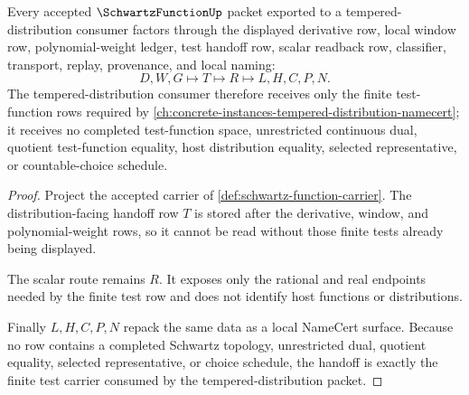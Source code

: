 \begin{theorem}
\label{thm:schwartz-function-tempered-distribution-handoff}
Every accepted $\SchwartzFunctionUp$ packet exported to a tempered-distribution consumer factors through the displayed derivative row, local window row, polynomial-weight ledger, test handoff row, scalar readback row, classifier, transport, replay, provenance, and local naming:
$$
D,W,G\longmapsto T\longmapsto R\longmapsto L,H,C,P,N .
$$
The tempered-distribution consumer therefore receives only the finite test-function rows required by \autoref{ch:concrete-instances-tempered-distribution-namecert}; it receives no completed test-function space, unrestricted continuous dual, quotient test-function equality, host distribution equality, selected representative, or countable-choice schedule.
\end{theorem}
\begin{proof}
Project the accepted carrier of \autoref{def:schwartz-function-carrier}. The distribution-facing handoff row $T$ is stored after the derivative, window, and polynomial-weight rows, so it cannot be read without those finite tests already being displayed.

The scalar route remains $R$. It exposes only the rational and real endpoints needed by the finite test row and does not identify host functions or distributions.

Finally $L,H,C,P,N$ repack the same data as a local NameCert surface. Because no row contains a completed Schwartz topology, unrestricted dual, quotient equality, selected representative, or choice schedule, the handoff is exactly the finite test carrier consumed by the tempered-distribution packet.
\end{proof}



